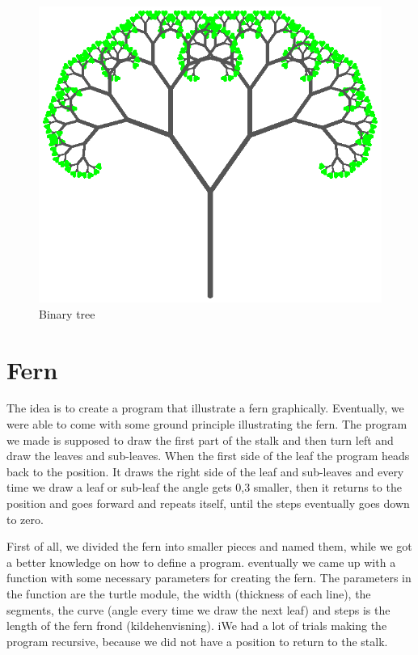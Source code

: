 \documentclass[titlepage]{article}
\begin{document}
\begin{figure}[H]
  \centering
  \includegraphics{bintree}
  \caption{Binary tree}
\end{figure}

\section{Fern}
The idea is to create a program that illustrate a fern graphically. Eventually, we were able to come with some ground principle illustrating the fern. The program we made is supposed to draw the first part of the stalk and then turn left and draw the leaves and sub-leaves. When the first side of the leaf the program heads back to the position. It draws the right side of the leaf and sub-leaves and every time we draw a leaf or sub-leaf the angle gets 0,3 smaller, then it returns to the position and goes forward and repeats itself, until the steps eventually goes down to zero.

First of all, we divided the fern into smaller pieces and named them, while we got a better knowledge on how to define a program. eventually we came up with a function with some necessary parameters for creating the fern. The parameters in the function are the turtle module, the width (thickness of each line), the segments, the curve (angle every time we draw the next leaf) and steps is the length of the fern frond (kildehenvisning). iWe had a lot of trials making the program recursive, because we did not have a position to return to the stalk.\par
\end{document}
